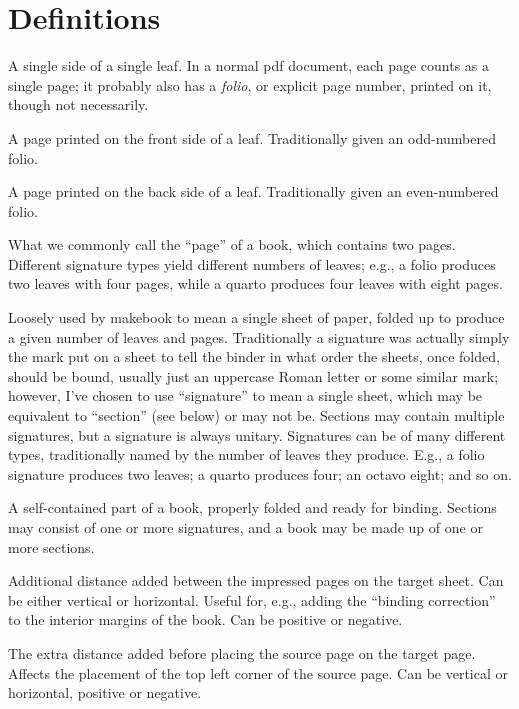 \documentclass[12pt,twoside,final]{extarticle}
\begin{document}
\section{Definitions}
\begin{description}[noitemsep]
\item[page]A single side of a single leaf.  In a normal pdf document, each page counts as a single page; it probably also has a \emph{folio}, or explicit page number, printed on it, though not necessarily.
\item[recto]A page printed on the front side of a leaf. Traditionally given an odd-numbered folio.
\item[verso]A page printed on the back side of a leaf. Traditionally given an even-numbered folio.
\item[leaf]What we commonly call the ``page'' of a book, which contains two pages. Different signature types yield different numbers of leaves; e.g., a folio produces two leaves with four pages, while a quarto produces four leaves with eight pages.
\item[signature]Loosely used by makebook to mean a single sheet of paper, folded up to produce a given number of leaves and pages. Traditionally a signature was actually simply the mark put on a sheet to tell the binder in what order the sheets, once folded, should be bound, usually just an uppercase Roman letter or some similar mark; however, I've chosen to use ``signature'' to mean a single sheet, which may  be equivalent to ``section'' (see below) or may not be. Sections may contain multiple signatures, but a signature is always unitary. Signatures can be of many different types, traditionally named by the number of leaves they produce. E.g., a folio signature produces two leaves; a quarto produces four; an octavo eight; and so on.
\item[section]A self-contained part of a book, properly folded and ready for binding. Sections may consist of one or more signatures, and a book may be made up of one or more sections.
\item[delta]Additional distance added between the impressed pages on the target sheet. Can be either vertical or horizontal. Useful for, e.g., adding the ``binding correction'' to the interior margins of the book. Can be positive or negative.
\item[offset]The extra distance added before placing the source page on the target page. Affects the placement of the top left corner of the source page. Can be vertical or horizontal, positive or negative.
\end{description}
\end{document}
